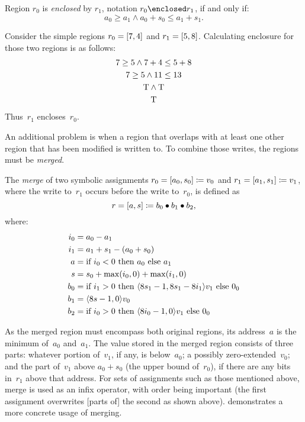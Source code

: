 \begin{definition}
  Region $r_0$ is \emph{enclosed} by $r_1$, notation $r_0\enclosed r_1$,
  if and only if:
  \begin{equation*}
    a_0\geq a_1\wedge a_0+s_0\leq a_1+s_1.
  \end{equation*}
\end{definition}
\begin{example}
  Consider the simple regions $r_0=[7,4]$ and $r_1=[5,8]$.
  Calculating enclosure for those two regions is as follows:
  \begin{gather*}
    7\geq 5\wedge 7+4\leq 5+8 \\
    7\geq 5\wedge 11\leq 13 \\
    \mathrm{T}\wedge\mathrm{T} \\
    \mathrm{T}
  \end{gather*}
  Thus~$r_1$ encloses~$r_0$.
\end{example}

An additional problem is when a region that overlaps with at least one other region
that has been modified is written to.
To combine those writes, the regions must be \emph{merged}.%
\begin{definition}\label{def:merge}
  The \emph{merge} of two symbolic assignments
  $r_0=[a_0,s_0]\coloneqq v_0$ and $r_1=[a_1,s_1]\coloneqq v_1$,
  where the write to~$r_1$ occurs before the write to~$r_0$,
  is defined as
  \begin{equation}
    r=[a,s]\coloneqq b_0\bullet b_1\bullet b_2,
  \end{equation}
  where:
  \begin{align*}
  i_0 &= a_0 - a_1 \\
  i_1 &= a_1 + s_1 - (a_0 + s_0) \\
  a   &= \text{if } i_0 < 0 \text{ then } a_0 \text{ else } a_1 \\
  s   &= s_0 + \max(i_0, 0) + \max(i_1, 0) \\
  b_0 &= \text{if } i_1 > 0 \text{ then }
  \langle8 s_1-1,8 s_1 - 8 i_1\rangle v_1 \text{ else } 0_0 \\
  b_1 &= \langle8 s-1, 0\rangle v_0 \\
  b_2 &= \text{if } i_0 > 0 \text{ then } \langle8 i_0-1, 0\rangle v_1 \text{ else } 0_0
  \end{align*}
\end{definition}
As the merged region must encompass both original regions,
its address~$a$ is the minimum of~$a_0$ and~$a_1$.
The value stored in the merged region consists of three parts:
whatever portion of~$v_1$, if any, is below~$a_0$;
a possibly zero-extended~$v_0$;
and the part of~$v_1$ above $a_0+s_0$ (the upper bound of~$r_0$),
if there are any bits in~$r_1$ above that address.
For sets of assignments such as those mentioned above,
merge is used as an infix operator, with order being important
(the first assignment overwrites [parts of] the second as shown above).
 demonstrates a more concrete usage of merging.

